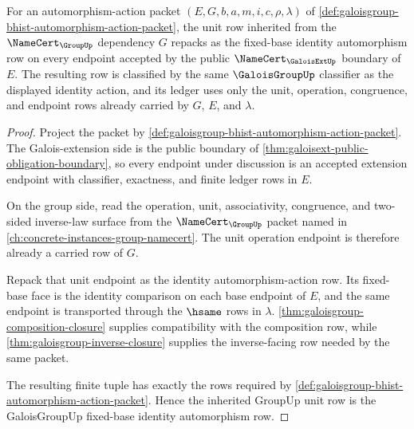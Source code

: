 \begin{theorem}
\label{thm:galoisgroup-unit-automorphism-row}
For an automorphism-action packet $(E,G,b,a,m,i,c,\rho,\lambda)$ of
\autoref{def:galoisgroup-bhist-automorphism-action-packet}, the unit row
inherited from the $\NameCert_{\GroupUp}$ dependency $G$ repacks as the
fixed-base identity automorphism row on every endpoint accepted by the public
$\NameCert_{\GaloisExtUp}$ boundary of $E$. The resulting row is classified by
the same $\GaloisGroupUp$ classifier as the displayed identity action, and its
ledger uses only the unit, operation, congruence, and endpoint rows already
carried by $G$, $E$, and $\lambda$.
\end{theorem}
\begin{proof}
Project the packet by
\autoref{def:galoisgroup-bhist-automorphism-action-packet}. The
Galois-extension side is the public boundary of
\autoref{thm:galoisext-public-obligation-boundary}, so every endpoint under
discussion is an accepted extension endpoint with classifier, exactness, and
finite ledger rows in $E$.

On the group side, read the operation, unit, associativity, congruence, and
two-sided inverse-law surface from the $\NameCert_{\GroupUp}$ packet named in
\autoref{ch:concrete-instances-group-namecert}. The unit operation endpoint is
therefore already a carried row of $G$.

Repack that unit endpoint as the identity automorphism-action row. Its
fixed-base face is the identity comparison on each base endpoint of $E$, and
the same endpoint is transported through the $\hsame$ rows in $\lambda$.
\autoref{thm:galoisgroup-composition-closure} supplies compatibility with the
composition row, while \autoref{thm:galoisgroup-inverse-closure} supplies the
inverse-facing row needed by the same packet.

The resulting finite tuple has exactly the rows required by
\autoref{def:galoisgroup-bhist-automorphism-action-packet}. Hence the inherited
GroupUp unit row is the GaloisGroupUp fixed-base identity automorphism row.
\end{proof}
